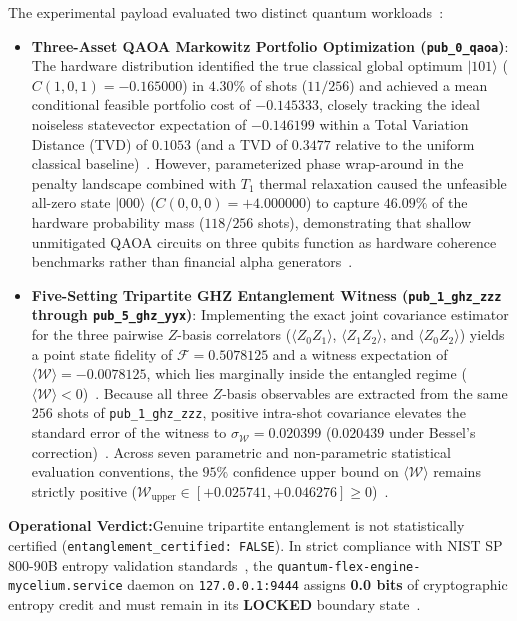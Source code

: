 \documentclass[10pt,letterpaper]{article}
\newcommand{\takeaway}[2]{%
  \vspace{4pt}\noindent\colorbox{calloutbg}{%
    \parbox{\dimexpr\textwidth-2\fboxsep\relax}{%
      \vspace{4pt}\textbf{\color{primary}#1:}\hspace{0.4em}#2\vspace{4pt}%
    }%
  }\vspace{4pt}%
}
\begin{document}
The experimental payload evaluated two distinct quantum workloads~\cite{qfx_doc}:
\begin{itemize}\setlength{\itemsep}{2pt}\setlength{\parskip}{0pt}
    \item \textbf{Three-Asset QAOA Markowitz Portfolio Optimization (\texttt{pub\_0\_qaoa})}: The hardware distribution identified the true classical global optimum $\vert 101 \rangle$ ($C(1,0,1) = -0.165000$) in $4.30\%$ of shots ($11/256$) and achieved a mean conditional feasible portfolio cost of $-0.145333$, closely tracking the ideal noiseless statevector expectation of $-0.146199$ within a Total Variation Distance (TVD) of $0.1053$ (and a TVD of $0.3477$ relative to the uniform classical baseline)~\cite{qfx_doc}. However, parameterized phase wrap-around in the penalty landscape combined with $T_1$ thermal relaxation caused the unfeasible all-zero state $\vert 000 \rangle$ ($C(0,0,0) = +4.000000$) to capture $46.09\%$ of the hardware probability mass ($118/256$ shots), demonstrating that shallow unmitigated QAOA circuits on three qubits function as hardware coherence benchmarks rather than financial alpha generators~\cite{qfx_doc}.
    \item \textbf{Five-Setting Tripartite GHZ Entanglement Witness (\texttt{pub\_1\_ghz\_zzz} through \texttt{pub\_5\_ghz\_yyx})}: Implementing the exact joint covariance estimator for the three pairwise $Z$-basis correlators ($\langle Z_0 Z_1 \rangle$, $\langle Z_1 Z_2 \rangle$, and $\langle Z_0 Z_2 \rangle$) yields a point state fidelity of $\mathcal{F} = 0.5078125$ and a witness expectation of $\langle \mathcal{W} \rangle = -0.0078125$, which lies marginally inside the entangled regime ($\langle \mathcal{W} \rangle < 0$)~\cite{qfx_doc}. Because all three $Z$-basis observables are extracted from the same $256$ shots of \texttt{pub\_1\_ghz\_zzz}, positive intra-shot covariance elevates the standard error of the witness to $\sigma_{\mathcal{W}} = 0.020399$ ($0.020439$ under Bessel's correction)~\cite{qfx_doc}. Across seven parametric and non-parametric statistical evaluation conventions, the $95\%$ confidence upper bound on $\langle \mathcal{W} \rangle$ remains strictly positive ($\mathcal{W}_{\text{upper}} \in [+0.025741, +0.046276] \ge 0$)~\cite{qfx_doc}.
\end{itemize}

\takeaway{Operational Verdict}{Genuine tripartite entanglement is not statistically certified (\texttt{entanglement\_certified: FALSE}). In strict compliance with NIST SP 800-90B entropy validation standards~\cite{nist_e259,nist_e214}, the \texttt{quantum-flex-engine-mycelium.service} daemon on \texttt{127.0.0.1:9444} assigns \textbf{0.0 bits} of cryptographic entropy credit and must remain in its \textbf{LOCKED} boundary state~\cite{qfx_doc}.}
\end{document}
